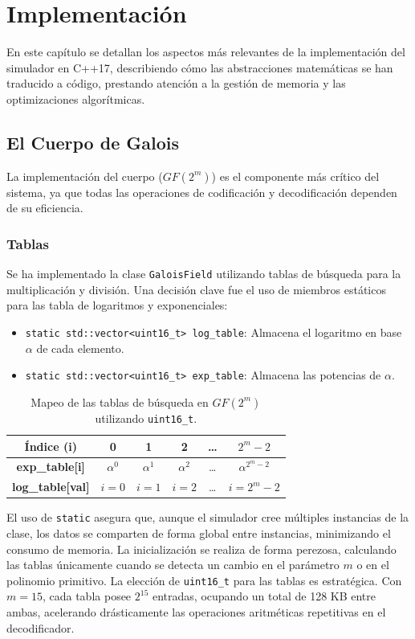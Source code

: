 \chapter{Implementación}
\label{cap:implementacion}

En este capítulo se detallan los aspectos más relevantes de la implementación del simulador en C++17, describiendo cómo las abstracciones matemáticas se han traducido a código, prestando atención a la gestión de memoria y las optimizaciones algorítmicas.

\section{El Cuerpo de Galois}
La implementación del cuerpo ($GF(2^m)$) es el componente más crítico del sistema, ya que todas las operaciones de codificación y decodificación dependen de su eficiencia.

\subsection{Tablas}
Se ha implementado la clase \verb|GaloisField| utilizando tablas de búsqueda para la multiplicación y división. Una decisión clave fue el uso de miembros estáticos para las tabla de logaritmos y exponenciales:

\begin{itemize}
    \item \verb|static std::vector<uint16_t> log_table|: Almacena el logaritmo en base $\alpha$ de cada elemento.
    \item \verb|static std::vector<uint16_t> exp_table|: Almacena las potencias de $\alpha$.
\end{itemize}
\begin{table}[h]
\centering
\begin{tabular}{|c|c|c|c|c|c|}
\hline
\textbf{Índice (i)} & 0 & 1 & 2 & \dots & $2^m-2$ \\ \hline
\textbf{exp\_table[i]} & $\alpha^0$ & $\alpha^1$ & $\alpha^2$ & \dots & $\alpha^{2^m-2}$ \\ \hline
\textbf{log\_table[val]} & $i=0$ & $i=1$ & $i=2$ & \dots & $i=2^m-2$ \\ \hline
\end{tabular}
\caption{Mapeo de las tablas de búsqueda en $GF(2^m)$ utilizando \texttt{uint16\_t}.}
\label{tab:tablas_gf}
\end{table}
El uso de \verb|static| asegura que, aunque el simulador cree múltiples instancias de la clase, los datos se comparten de forma global entre instancias, minimizando el consumo de memoria. La inicialización se realiza de forma perezosa, calculando las tablas únicamente cuando se detecta un cambio en el parámetro $m$ o en el polinomio primitivo. La elección de \verb|uint16_t| para las tablas es estratégica. Con $m=15$, cada tabla posee $2^{15}$ entradas, ocupando un total de 128 KB entre ambas, acelerando drásticamente las operaciones aritméticas repetitivas en el decodificador.

